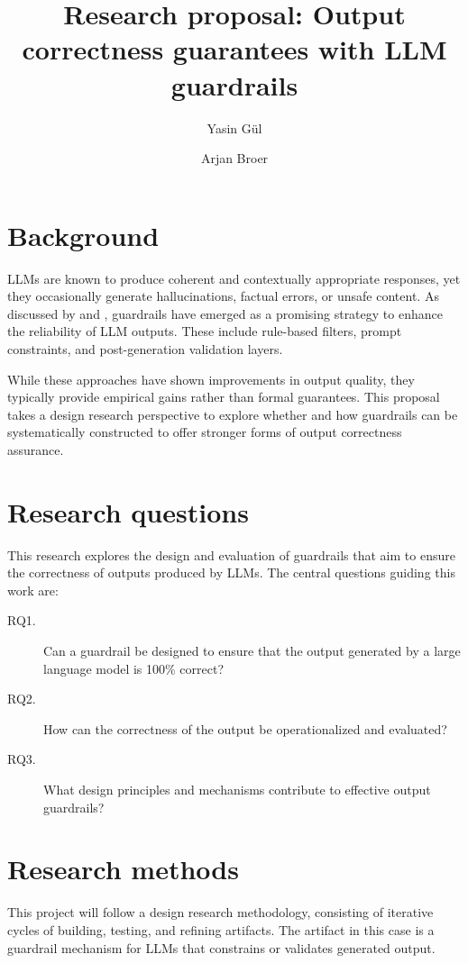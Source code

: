 \documentclass[a4paper,doc,natbib]{apa6}
\title{Research proposal: Output correctness guarantees with LLM guardrails}
\author{Yasin G\"{u}l \and Arjan Broer}
\affiliation{Open University of the Netherlands}
\begin{document}
    \maketitle

    \section{Background}

    LLMs are known to produce coherent and contextually appropriate responses, yet they occasionally generate hallucinations, factual errors, or unsafe content. As discussed by \citet{dong2024safeguarding} and \citet{ayyamperumal2024current}, guardrails have emerged as a promising strategy to enhance the reliability of LLM outputs. These include rule-based filters, prompt constraints, and post-generation validation layers.

    While these approaches have shown improvements in output quality, they typically provide empirical gains rather than formal guarantees. This proposal takes a design research perspective to explore whether and how guardrails can be systematically constructed to offer stronger forms of output correctness assurance.

    \section{Research questions}

    This research explores the design and evaluation of guardrails that aim to ensure the correctness of outputs produced by LLMs. The central questions guiding this work are:

    \begin{description}
        \item[RQ1.] Can a guardrail be designed to ensure that the output generated by a large language model is 100\% correct?
        \item[RQ2.] How can the correctness of the output be operationalized and evaluated?
        \item[RQ3.] What design principles and mechanisms contribute to effective output guardrails?
    \end{description}

    \section{Research methods}

    This project will follow a design research methodology, consisting of iterative cycles of building, testing, and refining artifacts. The artifact in this case is a guardrail mechanism for LLMs that constrains or validates generated output.
\end{document}
